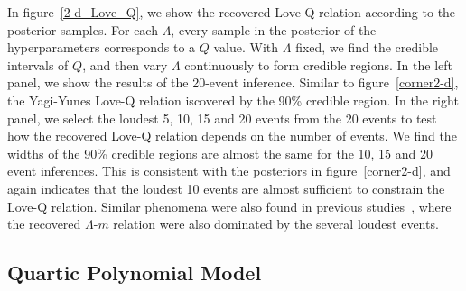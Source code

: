 \documentclass[a4paper,11pt]{article}
\begin{document}
In figure~\ref{2-d_Love_Q}, we show the recovered Love-Q relation according to the 
posterior samples. For each $\Lambda$, every sample in the posterior of the 
hyperparameters corresponds to a $Q$ value. With $\Lambda$ fixed, we find the 
credible intervals of $Q$, and then vary $\Lambda$ continuously to form credible 
regions. In the left panel, we show the results of the 20-event inference. Similar 
to figure~\ref{corner2-d}, the Yagi-Yunes Love-Q relation iscovered by the 90\% credible region. 
In the right panel, we select the loudest 5, 10, 15 and 20 events from the 20 events to test how the recovered Love-Q relation 
depends on the number of events. We find the widths of the 90\% credible regions 
are almost the same for the 10, 15 and 20 event inferences. This is consistent 
with the posteriors in figure~\ref{corner2-d}, and again indicates that the 
loudest 10 events are almost sufficient to constrain the Love-Q relation. Similar 
phenomena were also found in previous studies~\cite{Lackey:2014fwa,Landry:2020vaw,Pang:2020ilf,Finstad:2022oni,Bandopadhyay:2024zrr,Wang:2024xon}, 
where the recovered $\Lambda$-$m$ relation were also dominated by the several loudest events.

\subsection{Quartic Polynomial Model}
\label{subsec:results_quartic}
\end{document}
